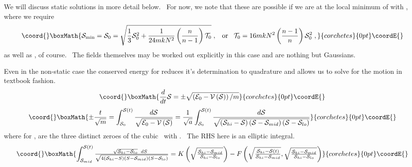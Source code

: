 \documentclass[a4paper,12pt]{article}%
\begin{document}
We will discuss static solutions in more detail below. \ For now, we note that
these are possible if we are at the local minimum of \coordHE{} with \coordHE{}, where we require
\[\coord{}\boxMath{
\mathcal{S}_{\min}=\mathcal{S}_{0}=\sqrt{\frac{1}{3}\mathcal{S}_{0}%
^{2}+\frac{1}{24mkN^{2}}\left(  \frac{n}{n-1}\right)  \mathcal{T}_{0}%
}\;,\;\;\;\text{or}\;\;\;\mathcal{T}_{0}=16mkN^{2}\left(  \frac{n-1}%
{n}\right)  \mathcal{S}_{0}^{2}\;,
}{corchetes}{0pt}\coordE{}\]
as well as \coordHE{}, of course. \ The fields themselves may be
worked out explicitly in this case and are nothing but Gaussians.

Even in the non-static case the conserved energy for \coordHE{} reduces
it's determination to quadrature and allows us to solve for the \coordHE{}
motion in textbook fashion.%
\[\coord{}\boxMath{
\frac{d}{dt}\mathcal{S=\pm}\sqrt{\left(  \mathcal{E}_{0}-\mathcal{V}\left(
\mathcal{S}\right)  \right)  /m}%
}{corchetes}{0pt}\coordE{}\]%
\[\coord{}\boxMath{
\pm\frac{t}{\sqrt{m}}=\int_{\mathcal{S}_{0}}^{\mathcal{S}\left(  t\right)
}\frac{d\mathcal{S}}{\sqrt{\mathcal{E}_{0}-\mathcal{V}\left(  \mathcal{S}%
\right)  }}=\frac{1}{\sqrt{a}}\int_{\mathcal{S}_{0}}^{\mathcal{S}\left(
t\right)  }\frac{d\mathcal{S}}{\sqrt{\left(  \mathcal{S}_{hi}-\mathcal{S}%
\right)  \left(  \mathcal{S}-\mathcal{S}_{mid}\right)  \left(  \mathcal{S}%
-\mathcal{S}_{lo}\right)  }}%
}{corchetes}{0pt}\coordE{}\]
where for \coordHE{}, \coordHE{} are the three distinct zeroes of the cubic
\coordHE{}\ with \coordHE{}. \ The RHS here is an elliptic integral.%
\[\coord{}\boxMath{
\int_{\mathcal{S}_{mid}}^{\mathcal{S}\left(  t\right)  }\tfrac{\sqrt
{\mathcal{S}_{hi}-\mathcal{S}_{lo}}\;\;dS\;\;}{\sqrt{4\left(  \mathcal{S}%
_{hi}-S\right)  \left(  S-\mathcal{S}_{mid}\right)  \left(  S-\mathcal{S}%
_{lo}\right)  }}=K\left(  \sqrt{\tfrac{\mathcal{S}_{hi}-\mathcal{S}_{mid}%
}{\mathcal{S}_{hi}-\mathcal{S}_{lo}}}\right)  -F\left(  \sqrt{\tfrac
{\mathcal{S}_{hi}-\mathcal{S}\left(  t\right)  }{\mathcal{S}_{hi}%
-\mathcal{S}_{mid}}},\sqrt{\tfrac{\mathcal{S}_{hi}-\mathcal{S}_{mid}%
}{\mathcal{S}_{hi}-\mathcal{S}_{lo}}}\right)
}{corchetes}{0pt}\coordE{}\]
\end{document}
